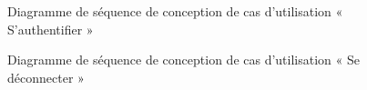 \begin{figure}[H]
  \centering
  \caption{Diagramme de séquence de conception de cas d'utilisation « S'authentifier »}
  \label{fig:sequence_conception_login}
\end{figure}

\begin{figure}[H]
  \centering
  \caption{Diagramme de séquence de conception de cas d'utilisation « Se déconnecter »}
  \label{fig:sequence_conception_logout}
\end{figure}

